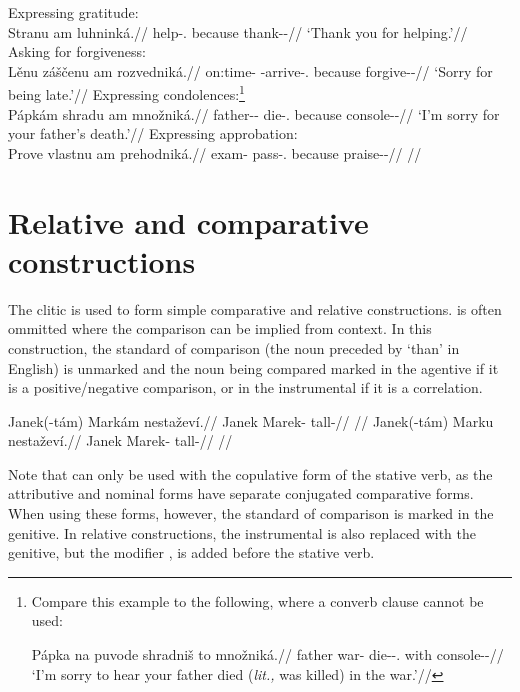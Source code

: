 \pex
\a Expressing gratitude:\\
\begingl
\gla Stranu am luhninká.//
\glb help-\Cv{}.\Pf{} because thank-\Pv{}-\Hort{}//
\glft `Thank you for helping.'//
\endgl
\a Asking for forgiveness:\\
\begingl
\gla Lěnu záščenu am rozvedniká.//
\glb on:time-\Ins{} \Neg{}-arrive-\Cv{}.\Pf{} because forgive-\Pv{}-\Hort{}//
\glft `Sorry for being late.'//
\endgl
\a Expressing condolences:\footnote{Compare this example to the following, where
a converb clause cannot be used:

\ex[lingstyle=fnex,belowexskip=-1em]
\begingl
\gla Pápka na puvode shradniš to množniká.//
\glb father \Loc{} war-\Acc{} die-\Pv{}-\Subj.\Pf{} \Rz{} with console-\Pv{}-\Hort{}//
\glft `I'm sorry to hear your father died (\emph{lit.,} was killed) in the war.'//
\endgl\xe}\\
\begingl
\gla Pápkám shradu am množniká.//
\glb father-\Dim{}-\Agt{} die-\Cv{}.\Pf{} because console-\Pv{}-\Hort{}//
\glft `I'm sorry for your father's death.'//
\endgl
\a Expressing approbation:\\
\begingl
\gla Prove vlastnu am prehodniká.//
\glb exam-\Acc{} pass-\Cv{}.\Pf{} because praise-\Pv{}-\Hort{}//
\glft {}//
\endgl
\xe

\section{Relative and comparative
constructions}\label{relativecomparative}

The clitic  is used to form simple comparative and
relative constructions.  is often ommitted where the comparison can be
implied from context. In this construction, the standard of
comparison (the noun preceded by `than' in
English) is unmarked and the noun being compared marked in the
agentive if it is a positive/negative comparison, or in the
instrumental if it is a correlation.

\pex
\a\begingl
\gla Janek(-tám) Markám nestaževí.//
\glb Janek Marek-\Agt{} tall-\Cont{}//
\glft {}//
\endgl
\a\begingl
\gla Janek(-tám) Marku nestaževí.//
\glb Janek Marek-\Ins{} tall-\Cont{}//
\glft {}//
\endgl
\xe

Note that  can only be used with the copulative form of the stative
verb, as the attributive and nominal forms have separate
conjugated comparative forms. When using these forms, however, the standard of
comparison is marked in the genitive. In relative
constructions, the instrumental is also replaced with
the genitive, but the modifier ,  is
added before the stative verb.

